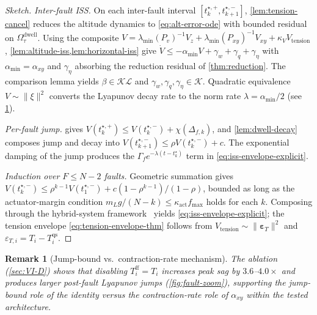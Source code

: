 \documentclass[lettersize,journal]{IEEEtran}
\newtheorem{remark}{Remark}%
\newcommand{\vect}[1]{\boldsymbol{#1}}
\begin{document}
\begin{proof}[Sketch]
\textit{Inter-fault ISS.} On each inter-fault interval $[t_k^{\star,+},t_{k+1}^{\star,-}]$, \cref{lem:tension-cancel} reduces the altitude dynamics to \eqref{eq:alt-error-ode} with bounded residual on $\Omega_\tau^{\mathrm{dwell}}$. Using the composite $V=\lambda_{\min}(P_v)^{-1}V_z+\lambda_{\min}(P_{xy})^{-1}V_{xy}+\kappa_V V_{\mathrm{tension}}$, \cref{lem:altitude-iss,lem:horizontal-iss} give $\dot V\le-\alpha_{\min}V+\gamma_w+\gamma_q+\gamma_\eta$ with $\alpha_{\min}=\alpha_{xy}$ and $\gamma_\eta$ absorbing the reduction residual of \cref{thm:reduction}. The comparison lemma yields $\beta\in\mathcal{KL}$ and $\gamma_w,\gamma_q,\gamma_\eta\in\mathcal{K}$. Quadratic equivalence $V\sim\|\xi\|^2$ converts the Lyapunov decay rate to the norm rate $\lambda=\alpha_{\min}/2$ (see \cref{rem:jump-vs-rate}).

\textit{Per-fault jump.}  gives $V(t_k^{\star,+})\le V(t_k^{\star,-})+\chi(\Delta_{f,k})$, and \cref{lem:dwell-decay} composes jump and decay into $V(t_{k+1}^{\star,-})\le\rho V(t_k^{\star,-})+c$. The exponential damping of the jump produces the $\Gamma_f e^{-\lambda(t-t_k^\star)}$ term in \eqref{eq:iss-envelope-explicit}.

\textit{Induction over $F\le N-2$ faults.} Geometric summation gives $V(t_k^{\star,-})\le\rho^{k-1}V(t_1^{\star,-})+c(1-\rho^{k-1})/(1-\rho)$, bounded as long as the actuator-margin condition $m_L g/(N-k)\le\kappa_{\mathrm{act}}f_{\max}$ holds for each $k$. Composing through the hybrid-system framework~\cite[Thm.~1]{GoebelSanfeliceTeel2012} yields \eqref{eq:iss-envelope-explicit}; the tension envelope \eqref{eq:tension-envelope-thm} follows from $V_{\mathrm{tension}}\sim\|\vect\varepsilon_T\|^2$ and $\varepsilon_{T,i}=T_i-T_i^{\mathrm{qs}}$.
\end{proof}

\begin{remark}[Jump-bound vs.\ contraction-rate mechanism]
\label{rem:jump-vs-rate}
The ablation (\cref{sec:VI-D}) shows that disabling $T_i^{\mathrm{ff}}=T_i$ increases peak sag by $3.6$--$4.0\times$ and produces larger post-fault Lyapunov jumps (\cref{fig:fault-zoom}), supporting the jump-bound role of the identity versus the contraction-rate role of $\alpha_{xy}$ within the tested architecture.
\end{remark}
\end{document}
